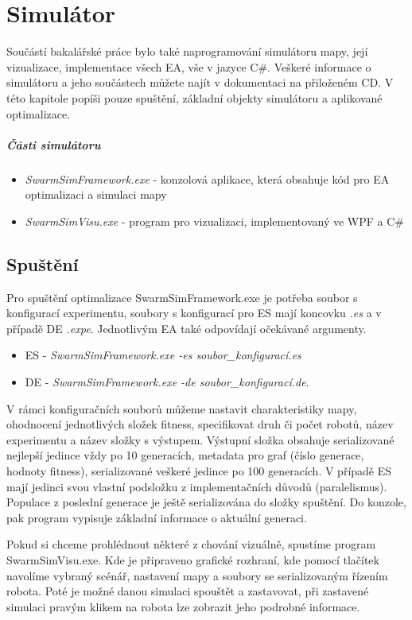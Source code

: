 
\chapter{Simulátor}
Součástí bakalářské práce bylo také naprogramování simulátoru mapy, její vizualizace, implementace všech EA, vše v jazyce C\#. Veškeré informace o simulátoru a jeho součástech můžete najít v dokumentaci na přiloženém CD. V této kapitole popíši pouze spuštění, základní objekty simulátoru a aplikované optimalizace. \par 
\paragraph{Části simulátoru}
\begin{itemize}
	\item \textit{SwarmSimFramework.exe} - konzolová aplikace, která obsahuje kód pro EA optimalizaci a simulaci mapy
	\item \textit{SwarmSimVisu.exe} - program pro vizualizaci, implementovaný ve WPF a C\# 
\end{itemize}

\section*{Spuštění}
Pro spuštění optimalizace SwarmSimFramework.exe je potřeba soubor s konfigurací experimentu, soubory s konfigurací pro ES mají koncovku \textit{.es} a v případě DE \textit{.expe}. Jednotlivým EA také odpovídají očekávané argumenty. 
\begin{itemize}
	\item ES - \textit{SwarmSimFramework.exe -es soubor\_konfigurací.es}  
	\item DE - \textit{SwarmSimFramework.exe -de soubor\_konfigurací.de}. 
\end{itemize}
\par 
V rámci konfiguračních souborů můžeme nastavit charakteristiky mapy, ohodnocení jednotlivých složek fitness, specifikovat druh či počet robotů, název experimentu a název složky s výstupem. Výstupní složka obsahuje serializované nejlepší jedince vždy po 10 generacích, metadata pro graf (číslo generace, hodnoty fitness), serializované veškeré jedince po 100 generacích. V případě ES mají jedinci svou vlastní podsložku z implementačních důvodů (paralelismus). Populace z poslední generace je ještě serializována do složky spuštění. Do konzole, pak program vypisuje základní informace o aktuální generaci.
\par 
Pokud si chceme prohlédnout některé z chování vizuálně, spustíme program SwarmSimVisu.exe. Kde je připraveno grafické rozhraní, kde pomocí tlačítek navolíme vybraný scénář, nastavení mapy a soubory se serializovaným řízením robota. Poté je možné danou simulaci spouštět a zastavovat, při zastavené simulaci pravým klikem na robota lze zobrazit jeho podrobné informace.

